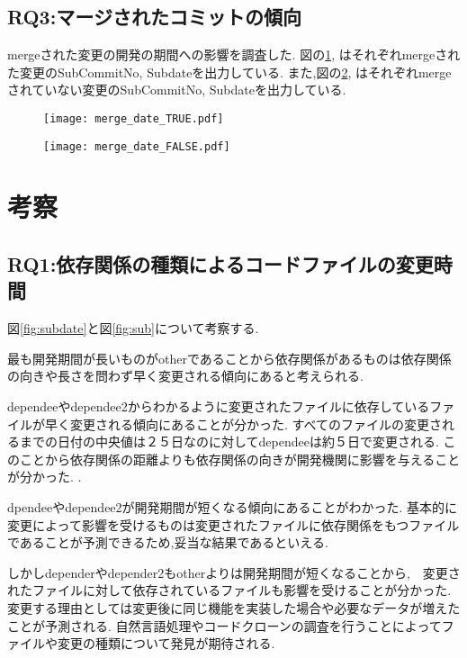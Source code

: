 \documentclass[submit,ses,noauthor]{ipsj} %
\begin{document}
\subsection{RQ3:マージされたコミットの傾向}
mergeされた変更の開発の期間への影響を調査した.
図の\ref{fig:merge_true_subNo},\label{fig:merge_true_subdate} はそれぞれmergeされた変更のSubCommitNo, Subdateを出力している.
また,図の\ref{fig:merge_false_subNo},\label{fig:merge_false_subdate} はそれぞれmergeされていない変更のSubCommitNo, Subdateを出力している.

\begin{figure}
\centering
\texttt{[image: merge\_date\_TRUE.pdf]}
\caption{}
\label{fig:merge_true_subNo} 
\end{figure}

\begin{figure}
\centering
\texttt{[image: merge\_date\_FALSE.pdf]}
\caption{}
\label{fig:merge_false_subNo} 
\end{figure}


\section{考察}\label{考察}

\subsection{RQ1:依存関係の種類によるコードファイルの変更時間}
図\ref{fig:subdate}と図\ref{fig:sub}について考察する.

最も開発期間が長いものがotherであることから依存関係があるものは依存関係の向きや長さを問わず早く変更される傾向にあると考えられる.


dependeeやdependee2からわかるように変更されたファイルに依存しているファイルが早く変更される傾向にあることが分かった.
すべてのファイルの変更されるまでの日付の中央値は２５日なのに対してdependeeは約５日で変更される.
このことから依存関係の距離よりも依存関係の向きが開発機関に影響を与えることが分かった.
.

dpendeeやdependee2が開発期間が短くなる傾向にあることがわかった.
基本的に変更によって影響を受けるものは変更されたファイルに依存関係をもつファイルであることが予測できるため,妥当な結果であるといえる.

しかしdependerやdepender2もotherよりは開発期間が短くなることから,　変更されたファイルに対して依存されているファイルも影響を受けることが分かった.
変更する理由としては変更後に同じ機能を実装した場合や必要なデータが増えたことが予測される.
自然言語処理やコードクローンの調査を行うことによってファイルや変更の種類について発見が期待される.
\end{document}
